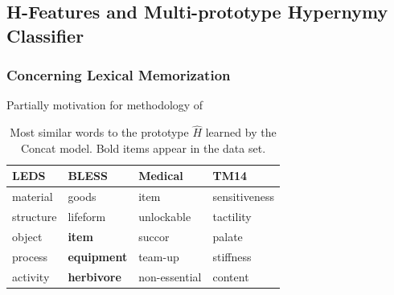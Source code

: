 \documentclass[letterpaper]{article}
\begin{document}
\subsection{H-Features and Multi-prototype Hypernymy Classifier}
\label{sec:multiprototype}


\subsubsection{Concerning Lexical Memorization}
\label{sec:lexmem}

Partially motivation for methodology of 

\begin{table}
\begin{center}
  \begin{small}
  \begin{tabular}{|llll|}
    \hline
    LEDS & BLESS & Medical & TM14\\
    \hline
     material       &      goods             &     item           &      sensitiveness          \\
     structure      &      lifeform          &     unlockable     &      tactility              \\
     object         & {\bf item}             &     succor         &      palate                 \\
     process        & {\bf equipment}        &     team-up        &      stiffness              \\
     activity       & {\bf herbivore}        &     non-essential  &      content                \\
    \hline
  \end{tabular}
  \end{small}
\end{center}
\caption{Most similar words to the prototype $\hat H$ learned by the Concat model. Bold items
appear in the data set.}
\label{tab:wordsim}
\end{table}
\end{document}
